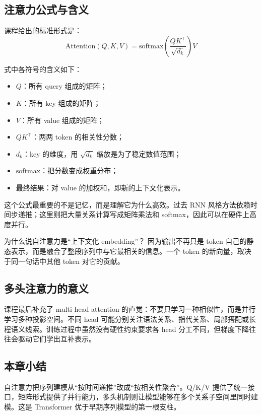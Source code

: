 \documentclass[a4paper]{article}
\begin{document}
\subsection{注意力公式与含义}

课程给出的标准形式是：
\[
\mathrm{Attention}(Q, K, V)=\mathrm{softmax}\left(\frac{QK^\top}{\sqrt{d_k}}\right)V
\]

式中各符号的含义如下：
\begin{itemize}
\item \(Q\)：所有 query 组成的矩阵；
\item \(K\)：所有 key 组成的矩阵；
\item \(V\)：所有 value 组成的矩阵；
\item \(QK^\top\)：两两 token 的相关性分数；
\item \(d_k\)：key 的维度，用 \(\sqrt{d_k}\) 缩放是为了稳定数值范围；
\item \(\mathrm{softmax}\)：把分数变成权重分布；
\item 最终结果：对 value 的加权和，即新的上下文化表示。
\end{itemize}

这个公式最重要的不是记忆，而是理解它为什么高效。过去 RNN 风格方法依赖时间步递推；这里则把大量关系计算写成矩阵乘法和 softmax，因此可以在硬件上高度并行。

\begin{knowledgebox}{为什么说自注意力是“上下文化 embedding”？}
因为输出不再只是 token 自己的静态表示，而是融合了整段序列中与它最相关的信息。一个 token 的新向量，取决于同一句话中其他 token 对它的贡献。
\end{knowledgebox}

\subsection{多头注意力的意义}

课程最后补充了 multi-head attention 的直觉：不要只学习一种相似性，而是并行学习多种投影空间。不同 head 可能分别关注语法关系、指代关系、局部搭配或长程语义线索。训练过程中虽然没有硬性约束要求各 head 分工不同，但梯度下降往往会驱动它们学出互补表示。

\subsection{本章小结}

自注意力把序列建模从“按时间递推”改成“按相关性聚合”。Q/K/V 提供了统一接口，矩阵形式提供了并行能力，多头机制则让模型能够在多个关系子空间里同时建模。这是 Transformer 优于早期序列模型的第一根支柱。
\end{document}
